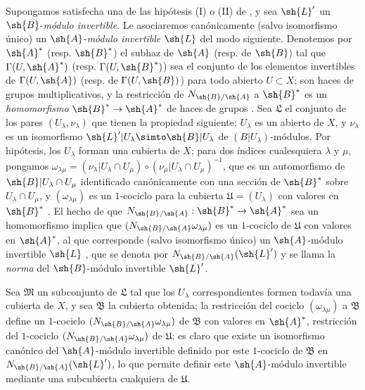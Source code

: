 \documentclass[oneside,10pt]{amsart}
\makeatletter
\newcommand{\ega@arrow}[2]{\mathchoice{#1}{#2}{#2}{#2}}
\renewcommand{\to}{\ega@arrow{\longrightarrow}{\rightarrow}}
\newcommand{\oldpage}[2][]{\marginnote{\normalfont\footnotesize\textbf{#1}~|~#2}\ignorespaces}
\let\EGAOriginalLabel\label
\renewcommand{\label}[1]{\phantomsection\EGAOriginalLabel{#1}}
\makeatother
\begin{document}
\begin{env}[6.5.2]
\label{II.6.5.2}
Supongamos satisfecha una de las hipótesis (I) o (II) de , y sea $\sh{L}'$ un $\sh{B}$-\emph{módulo invertible}.
Le asociaremos canónicamente (salvo isomorfismo único) un $\sh{A}$-\emph{módulo invertible} $\sh{L}$ del modo siguiente.
Denotemos por $\sh{A}^*$ (resp. $\sh{B}^*$) el subhaz de $\sh{A}$ (resp. de $\sh{B}$) tal que $\Gamma(U,\sh{A}^*)$ (resp. $\Gamma(U,\sh{B}^*)$) sea el conjunto de los elementos invertibles de $\Gamma(U,\sh{A})$ (resp. de $\Gamma(U,\sh{B})$) para todo abierto $U\subset X$;
\oldpage[II]{127}
son haces de grupos multiplicativos, y la restricción de $N_{\sh{B}/\sh{A}}$ a $\sh{B}^*$ es un \emph{homomorfismo} $\sh{B}^*\to\sh{A}^*$ de haces de grupos .
Sea $\mathfrak{L}$ el conjunto de los pares $(U_\lambda,\nu_\lambda)$ que tienen la propiedad siguiente: $U_\lambda$ es un abierto de $X$, y $\nu_\lambda$ es un isomorfismo $\sh{L}'|U_\lambda\simto\sh{B}|U_\lambda$ de $(B|U_\lambda)$-módulos.
Por hipótesis, los $U_\lambda$ forman una cubierta de $X$;
para dos índices cualesquiera $\lambda$ y $\mu$, pongamos $\omega_{\lambda\mu}=(\nu_\lambda|U_\lambda\cap U_\mu)\circ(\nu_\mu|U_\lambda\cap U_\mu)^{-1}$, que es un automorfismo de $\sh{B}|U_\lambda\cap U_\mu$ identificado canónicamente con una sección de $\sh{B}^*$ sobre $U_\lambda\cap U_\mu$, y $(\omega_{\lambda\mu})$ es un $1$-cociclo para la cubierta $\mathfrak{U}=(U_\lambda)$ con valores en $\sh{B}^*$ .
El hecho de que $N_{\sh{B}/\sh{A}}:\sh{B}^*\to\sh{A}^*$ sea un homomorfismo implica que $(N_{\sh{B}/\sh{A}}\omega_{\lambda\mu})$ es un $1$-cociclo de $\mathfrak{U}$ con valores en $\sh{A}^*$, al que corresponde (salvo isomorfismo único) un $\sh{A}$-módulo invertible $\sh{L}$ , que se denota por $N_{\sh{B}/\sh{A}}(\sh{L}')$ y se llama la \emph{norma} del $\sh{B}$-módulo invertible $\sh{L}'$.

Sea $\mathfrak{M}$ un subconjunto de $\mathfrak{L}$ tal que los $U_\lambda$ correspondientes formen todavía una cubierta de $X$, y sea $\mathfrak{B}$ la cubierta obtenida;
la restricción del cociclo $(\omega_{\lambda\mu})$ a $\mathfrak{B}$ define un $1$-cociclo $(N_{\sh{B}/\sh{A}}\omega_{\lambda\mu})$ de $\mathfrak{B}$ con valores en $\sh{A}^*$, restricción del $1$-cociclo $(N_{\sh{B}/\sh{A}}\omega_{\lambda\mu})$ de $\mathfrak{U}$;
es claro que existe un isomorfismo canónico del $\sh{A}$-módulo invertible definido por este $1$-cociclo de $\mathfrak{B}$ en $N_{\sh{B}/\sh{A}}(\sh{L}')$, lo que permite definir este $\sh{A}$-módulo invertible mediante una subcubierta cualquiera de $\mathfrak{U}$.


\end{env}
\end{document}

